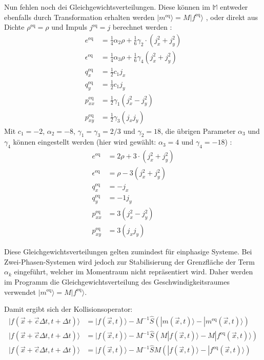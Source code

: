 \documentclass[a4paper,10pt]{scrreprt}
\begin{document}
Nun fehlen noch dei Gleichgewichtsverteilungen. Diese können im $\mathbb{M}$ entweder ebenfalls durch Transformation erhalten werden $|m^{\text{eq}}\rangle = M |f^{\text{eq}}\rangle $ \cite{Yu2010}, oder direkt aus Dichte $\rho^{\text{eq}} = \rho$ und Impuls $j^{\text{eq}} = j$ berechnet werden \cite{Lallemand2000}:
\begin{align}
 e^{\text{eq}} &= \frac{1}{4} \alpha_2 \rho + \frac{1}{6} \gamma_2 \cdot(j_x^2 + j_y^2) \\
 \epsilon^{\text{eq}} &= \frac{1}{4} \alpha_3 \rho + \frac{1}{6} \gamma_4 (j_x^2 + j_y^2) \\
 q_x^{\text{eq}} &= \frac{1}{2} c_1 j_x \\
 q_y^{\text{eq}} &= \frac{1}{2} c_1 j_y \\
 p_{xx}^{\text{eq}} &= \frac{1}{2} \gamma_1 (j_x^2 - j_y^2) \\
 p_{xy}^{\text{eq}} &= \frac{1}{2} \gamma_3 (j_x j_y)
\end{align}
Mit $c_1 = -2$, $\alpha_2 = -8$, $\gamma_1 = \gamma_3 = 2/3$ und $\gamma_2 = 18$, die übrigen Parameter $\alpha_3$ und $\gamma_4$ können eingestellt werden (hier wird gewählt: $\alpha_3 = 4$ und $\gamma_4 = -18$) \cite{Lallemand2000}:
\begin{align}
 e^{\text{eq}} &=  2\rho + 3 \cdot(j_x^2 + j_y^2) \\
 \epsilon^{\text{eq}} &= \rho -3 (j_x^2 + j_y^2) \\
 q_x^{\text{eq}} &= - j_x \\
 q_y^{\text{eq}} &= -1 j_y \\
 p_{xx}^{\text{eq}} &= 3 (j_x^2 - j_y^2) \\
 p_{xy}^{\text{eq}} &= 3 (j_x j_y)
\end{align} 
 
Diese Gleichgewichtsverteilungen gelten zumindest für einphasige Systeme. Bei Zwei-Phasen-Systemen wird jedoch zur Stabilisierung der Grenzfläche der Term $\alpha_k$ eingeführt, welcher im Momentraum nicht repräsentiert wird.
Daher werden im Programm die Gleichgewichtsverteilung des Geschwindigkeitsraumes verwendet $|m^{\text{eq}}\rangle = M |f^{\text{eq}}\rangle $.

Damit ergibt sich der Kollisionsoperator:
\begin{align}
 | f(\vec{x} + \vec{c} \Delta t, t + \Delta t) \rangle &= | f(\vec{x},t) \rangle - M^{-1} \hat{S} \left( | m(\vec{x},t) \rangle - | m^{\text{eq}}(\vec{x},t) \rangle \right) \\
 | f(\vec{x} + \vec{c} \Delta t, t + \Delta t) \rangle &= | f(\vec{x},t) \rangle - M^{-1} \hat{S} \left( M | f(\vec{x},t) \rangle - M | f^{\text{eq}}(\vec{x},t) \rangle \right) \\
 | f(\vec{x} + \vec{c} \Delta t, t + \Delta t) \rangle &= | f(\vec{x},t) \rangle - M^{-1} \hat{S} M \left( | f(\vec{x},t) \rangle - | f^{\text{eq}}(\vec{x},t) \rangle \right) \\
\end{align}
\end{document}
